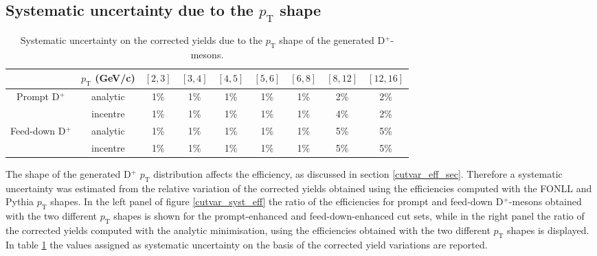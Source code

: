 \documentclass[b5paper,10pt,twoside,oldstyle,classica]{toptesi}
\newcommand{\pt}{p_\text{T}}
\begin{document}
\subsection{Systematic uncertainty due to the $\pt$ shape} 
\begin{table}[b]
\centering 
\begin{center} %
\renewcommand\arraystretch{1.1} 
\fontsize{8.5}{11}\selectfont
\begin{tabular}{|c|c|c|c|c|c|c|c|c|}
\cline{2-9}
\multicolumn{1}{c|}{} & $\pt$ (GeV/c) & $[2,3]$ & $[3,4]$ & $[4,5]$ & $[5,6]$ & $[6,8]$ & $[8,12]$ & $[12,16]$\\
\hline
\multirow{2}{*}{Prompt D$^+$} & analytic & 1\% & 1\% & 1\% & 1\% & 1\% & 2\% & 2\%\\
& incentre & 1\% & 1\% & 1\% & 1\% & 1\% & 4\% & 2\%\\
\hline
\multirow{2}{*}{Feed-down D$^+$} & analytic & 1\% & 1\% & 1\% & 1\% & 1\% & 5\% & 5\%\\
& incentre & 1\% & 1\% & 1\% & 1\% & 1\% & 5\% & 5\%\\
\hline
\end{tabular} 
\caption{Systematic uncertainty on the corrected yields due to the $\pt$ shape of the generated D$^+$-mesons.}
\label{cutvar_syst_eff_tab}
\end{center} 
\end{table} 
The shape of the generated D$^+$ $\pt$ distribution affects the efficiency, as discussed in section \ref{cutvar_eff_sec}. Therefore a systematic uncertainty was estimated from the relative variation of the corrected yields obtained using the efficiencies computed with the FONLL and Pythia $\pt$ shapes.  In the left panel of figure \ref{cutvar_syst_eff} the ratio of the efficiencies for prompt and feed-down D$^+$-mesons obtained with the two different $\pt$ shapes is shown for the prompt-enhanced and feed-down-enhanced cut sets, while in the right panel the ratio of the corrected yields computed with the analytic minimisation, using the efficiencies obtained with the two different $\pt$ shapes is displayed. In table \ref{cutvar_syst_eff_tab} the values assigned as systematic uncertainty on the basis of the corrected yield variations are reported.  
\end{document}
